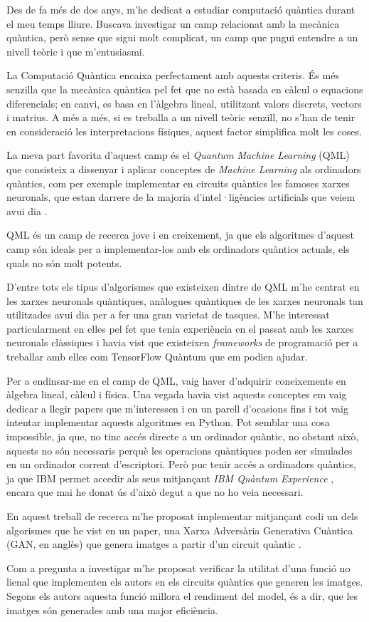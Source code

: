 Des de fa més de dos anys, m'he dedicat a estudiar computació quàntica durant el meu temps lliure. Buscava investigar un camp relacionat amb la mecànica quàntica, però sense que sigui molt complicat, un camp que pugui entendre a un nivell teòric i que m'entusiasmi.

La Computació Quàntica encaixa perfectament amb aquests criteris. És més senzilla que la mecànica quàntica pel fet que no està basada en càlcul o equacions diferencials; en canvi, es basa en l'àlgebra lineal, utilitzant valors discrets, vectors i matrius. A més a més, si es treballa a un nivell teòric senzill, no s'han de tenir en consideració les interpretacions físiques, aquest factor simplifica molt les coses.

La meva part favorita d'aquest camp és el \textit{Quantum Machine Learning} (QML) que consisteix a dissenyar i aplicar conceptes de \textit{Machine Learning} als ordinadors quàntics, com per exemple implementar en circuits quàntics les famoses xarxes neuronals, que estan darrere de la majoria d'intel·ligències artificials que veiem avui dia \cite{schuld:2014}.

QML és un camp de recerca jove i en creixement, ja que els algoritmes d'aquest camp són ideals per a implementar-los amb els ordinadors quàntics actuals, els quals no són molt potents.

D'entre tots els tipus d'algorismes que existeixen dintre de QML m'he centrat en les xarxes neuronals quàntiques, anàlogues quàntiques de les xarxes neuronals tan utilitzades avui dia per a fer una gran varietat de tasques. M'he interessat particularment en elles pel fet que tenia experiència en el passat amb les xarxes neuronals clàssiques i havia vist que existeixen \textit{frameworks} de programació per a treballar amb elles com TensorFlow Quàntum \cite{tfq} que em podien ajudar.

Per a endinsar-me en el camp de QML, vaig haver d'adquirir coneixements en àlgebra lineal, càlcul i física. Una vegada havia vist aquests conceptes em vaig dedicar a llegir papers que m'interessen i en un parell d'ocasions fins i tot vaig intentar implementar aquests algoritmes en Python. Pot semblar una cosa impossible, ja que, no tinc accés directe a un ordinador quàntic, no obstant això, aquests no són necessaris perquè les operacions quàntiques poden ser simulades en un ordinador corrent d'escriptori. Però puc tenir accés a ordinadors quàntics, ja que IBM permet accedir als seus mitjançant \textit{IBM Quàntum Experience} \cite{IBM_Q}, encara que mai he donat ús d'això degut a que no ho veia necessari.

En aquest treball de recerca m'he proposat implementar mitjançant codi un dels algorismes que he vist en un paper, una Xarxa Adversària Generativa Cuàntica (GAN, en anglès) \cite{GAN2014} que genera imatges a partir d'un circuit quàntic \cite{QGAN_exp}.

Com a pregunta a investigar m'he proposat verificar la utilitat d'una funció no lienal que implementen els autors en els circuits quàntics que generen les imatges. Segons els autors aquesta funció millora el rendiment del model, és a dir, que les imatges són generades amb una major eficiència.


